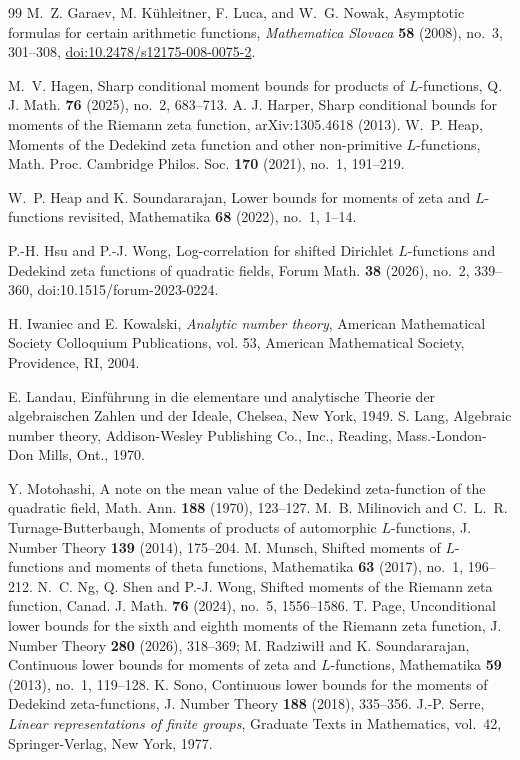 \documentclass[twoside,reqno,11pt,a4paper]{amsart}
\numberwithin{equation}{section}
\theoremstyle{plain}
\theoremstyle{definition}
\theoremstyle{remark}
\begin{document}
\begin{thebibliography}{99}
		 M.~Z. Garaev, M. K\"uhleitner, F. Luca, and W.~G. Nowak, Asymptotic formulas for certain arithmetic functions, \emph{Mathematica Slovaca} \textbf{58} (2008), no.~3, 301--308, \href{https://doi.org/10.2478/s12175-008-0075-2}{doi:10.2478/s12175-008-0075-2}.

		 M.~V. Hagen, Sharp conditional moment bounds for products of $L$-functions, Q. J. Math. \textbf{76} (2025), no.~2, 683--713.
		 A. J. Harper, Sharp conditional bounds for moments of the Riemann zeta function, arXiv:1305.4618 (2013).
		 W.~P. Heap, Moments of the Dedekind zeta function and other non-primitive $L$-functions, Math. Proc. Cambridge Philos. Soc. \textbf{170} (2021), no.~1, 191--219.

         W.~P. Heap and K. Soundararajan, Lower bounds for moments of zeta and $L$-functions revisited, Mathematika \textbf{68} (2022), no.~1, 1--14.
        
		 P.-H. Hsu and P.-J. Wong, Log-correlation for shifted Dirichlet $L$-functions and Dedekind zeta functions of quadratic fields, Forum Math. \textbf{38} (2026), no.~2, 339--360, doi:10.1515/forum-2023-0224.
		
         H. Iwaniec and E. Kowalski, \textit{Analytic number theory}, American Mathematical Society Colloquium Publications, vol. 53, American Mathematical Society, Providence, RI, 2004.
        
        E. Landau, {Einf\"uhrung in die elementare und analytische Theorie der algebraischen Zahlen und der Ideale}, Chelsea, New York, 1949.
         S. Lang,  Algebraic number theory, Addison-Wesley Publishing Co., Inc., Reading, Mass.-London-Don Mills, Ont., 1970.
     
		 Y. Motohashi, A note on the mean value of the Dedekind zeta-function of the quadratic field, Math. Ann. \textbf{188} (1970), 123--127. 
		 M.~B. Milinovich and C.~L.~R. Turnage-Butterbaugh, Moments of products of automorphic $L$-functions, J. Number Theory \textbf{139} (2014), 175--204.
		 M. Munsch, Shifted moments of $L$-functions and moments of theta functions, Mathematika \textbf{63} (2017), no.~1, 196--212.
		 N.~C. Ng, Q. Shen and P.-J. Wong, Shifted moments of the Riemann zeta function, Canad. J. Math. \textbf{76} (2024), no.~5, 1556--1586.
        T. Page, Unconditional lower bounds for the sixth and eighth moments of the Riemann zeta function, J. Number Theory {\bf 280} (2026), 318--369; 
		 M. Radziwi\l\l{} and K. Soundararajan, Continuous lower bounds for moments of zeta and $L$-functions, Mathematika \textbf{59} (2013), no.~1, 119--128.
		 K. Sono, Continuous lower bounds for the moments of Dedekind zeta-functions, J. Number Theory \textbf{188} (2018), 335--356.
		 J.-P. Serre, \textit{Linear representations of finite groups}, Graduate Texts in Mathematics, vol.~42, Springer-Verlag, New York, 1977.


\end{thebibliography}
\end{document}
